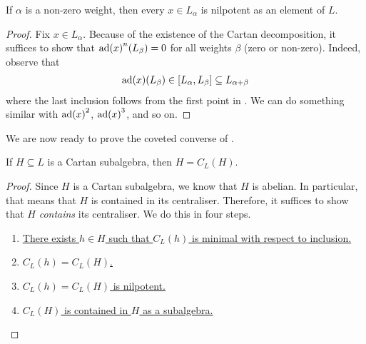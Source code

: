\begin{corollary}
    If $\alpha$ is a non-zero weight, then every $x \in L_{\alpha}$ is nilpotent as an element of $L$.
\end{corollary}
\begin{proof}
    Fix $x \in L_{\alpha}$. Because of the existence of the Cartan decomposition, it suffices to show that $\operatorname{ad}\!\left( x \right)^n\!\left( L_{\beta} \right) = 0$ for all weights $\beta$ (zero or non-zero). Indeed, observe that
    \begin{align*}
        \operatorname{ad}\!\left( x \right)\!\left( L_{\beta} \right) \in \left[ L_{\alpha}, L_{\beta} \right] \subseteq L_{\alpha + \beta}
    \end{align*}
    where the last inclusion follows from the first point in . We can do something similar with $\operatorname{ad}\!\left( x \right)^2$, $\operatorname{ad}\!\left( x \right)^3$, and so on. \sorry %
\end{proof}

We are now ready to prove the coveted converse of .

\begin{boxtheorem}
    If $H \subseteq L$ is a Cartan subalgebra, then $H = C_L(H)$.
\end{boxtheorem}
\begin{proof}
    Since $H$ is a Cartan subalgebra, we know that $H$ is abelian. In particular, that means that $H$ is contained in its centraliser. Therefore, it suffices to show that $H$ \emph{contains} its centraliser. We do this in four steps.
    \begin{enumerate}
        \item\underline{There exists $h \in H$ such that $C_L(h)$ is minimal with respect to inclusion.}

        \item\underline{$C_L(h) = C_L(H)$.}

        \item\underline{$C_L(h) = C_L(H)$ is nilpotent.}

        \item\underline{$C_L(H)$ is contained in $H$ as a subalgebra.}
    \end{enumerate}
\end{proof}